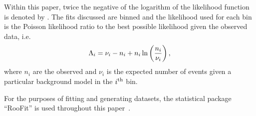 Within this paper, twice the negative of the logarithm of the likelihood
function is denoted by \nll. The fits discussed are binned and the 
likelihood used for each bin is the Poisson likelihood ratio to the best
possible likelihood given the observed data, i.e.
\begin{equation}
\nll_i = \nu_i - n_i + n_i \ln\left(\frac{n_i}{\nu_i}\right),
\label{eqn:introduction:def2NLL}
\end{equation}
where $n_{i}$ are the observed and $\nu_{i}$ is the expected number of events 
given a particular background model in the $i^{\rm th}$ bin. 

For the purposes of fitting and generating datasets, the statistical package 
``RooFit'' is used throughout this paper~\cite{ref:roofit}. 


